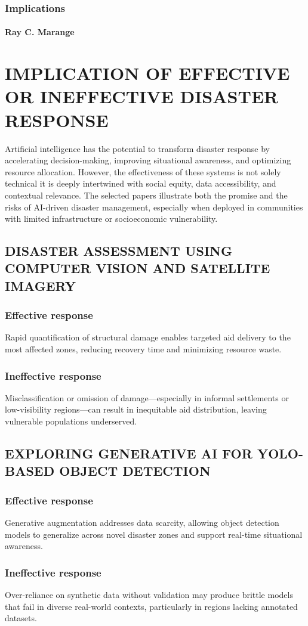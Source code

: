\documentclass{beamer}
\newcommand{\namedframe}[3]{
  \begin{frame}
    \frametitle{#2}
    \framesubtitle{#1}
    #3
  \end{frame}
}
\begin{document}
\namedframe{Ray C. Marange}{Implications}{
\section{IMPLICATION OF EFFECTIVE OR INEFFECTIVE DISASTER RESPONSE}
Artificial intelligence has the potential to transform disaster response by accelerating decision-making, improving situational awareness, and optimizing resource allocation. However, the effectiveness of these systems is not solely technical it is deeply intertwined with social equity, data accessibility, and contextual relevance. The selected papers illustrate both the promise and the risks of AI-driven disaster management, especially when deployed in communities with limited infrastructure or socioeconomic vulnerability.
\subsection{DISASTER ASSESSMENT USING COMPUTER VISION AND SATELLITE IMAGERY}
\subsubsection{Effective response}
Rapid quantification of structural damage enables targeted aid delivery to the most affected zones, reducing recovery time and minimizing resource waste.
\subsubsection{Ineffective response}
Misclassification or omission of damage—especially in informal settlements or low-visibility regions—can result in inequitable aid distribution, leaving vulnerable populations underserved.
\subsection{EXPLORING GENERATIVE AI FOR YOLO-BASED OBJECT DETECTION}
\subsubsection{Effective response}
Generative augmentation addresses data scarcity, allowing object detection models to generalize across novel disaster zones and support real-time situational awareness.
\subsubsection{Ineffective response}
Over-reliance on synthetic data without validation may produce brittle models that fail in diverse real-world contexts, particularly in regions lacking annotated datasets.
}
\end{document}
